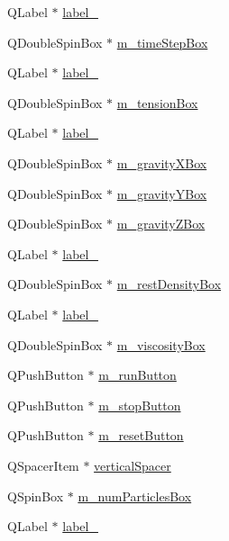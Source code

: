 \begin{DoxyCompactItemize}
\item 
QLabel $\ast$ \hyperlink{classUi__MainWindow_a0376fd90247280e7c7957cc70628708c}{label\_}
\item 
QDoubleSpinBox $\ast$ \hyperlink{classUi__MainWindow_abc208bcf25fb6e90d8952694211f109a}{m\_\-timeStepBox}
\item 
QLabel $\ast$ \hyperlink{classUi__MainWindow_a9dc4dba26b83e0c94aa566e1c564420b}{label\_}
\item 
QDoubleSpinBox $\ast$ \hyperlink{classUi__MainWindow_aed189246fd8fbb26a2ece932b8c03615}{m\_\-tensionBox}
\item 
QLabel $\ast$ \hyperlink{classUi__MainWindow_aa2621565827195e88436fb54220bb48d}{label\_}
\item 
QDoubleSpinBox $\ast$ \hyperlink{classUi__MainWindow_adc503564af3df70c4a6cde0c93a079c2}{m\_\-gravityXBox}
\item 
QDoubleSpinBox $\ast$ \hyperlink{classUi__MainWindow_adddb9f038cf6f566a7cf0ba0802afaf8}{m\_\-gravityYBox}
\item 
QDoubleSpinBox $\ast$ \hyperlink{classUi__MainWindow_aec3524ddb9738f81ad14b0409c23a98c}{m\_\-gravityZBox}
\item 
QLabel $\ast$ \hyperlink{classUi__MainWindow_a663f728e6244926a795c6e6892673b1d}{label\_}
\item 
QDoubleSpinBox $\ast$ \hyperlink{classUi__MainWindow_a7ff20accfdc12db98eeeceaf1bd145b4}{m\_\-restDensityBox}
\item 
QLabel $\ast$ \hyperlink{classUi__MainWindow_af183bfbfb9f38bbdd60caf92b15e23dc}{label\_}
\item 
QDoubleSpinBox $\ast$ \hyperlink{classUi__MainWindow_aed67342868bc3330ef288206a46c2e9f}{m\_\-viscosityBox}
\item 
QPushButton $\ast$ \hyperlink{classUi__MainWindow_a4c6abf58735917e5f2a72face76cbc41}{m\_\-runButton}
\item 
QPushButton $\ast$ \hyperlink{classUi__MainWindow_af0a56879050b5b59965ddb9cc20ad9cc}{m\_\-stopButton}
\item 
QPushButton $\ast$ \hyperlink{classUi__MainWindow_a5caf92edd8ee08153a3d67dd2718429e}{m\_\-resetButton}
\item 
QSpacerItem $\ast$ \hyperlink{classUi__MainWindow_a8384329c3663ff274e926a12024aab52}{verticalSpacer}
\item 
QSpinBox $\ast$ \hyperlink{classUi__MainWindow_a0cedebd0130144b48a6dc129fedd5030}{m\_\-numParticlesBox}
\item 
QLabel $\ast$ \hyperlink{classUi__MainWindow_a882200d8ae16962f5dd3b749ebacbf7e}{label\_}

\end{DoxyCompactItemize}
